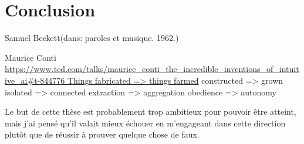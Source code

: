 %
\chapter{Conclusion}
\label{ch:conclusion}

{Samuel Beckett}{(dans: paroles et musique. 1962.)}

Maurice Conti
\url{https://www.ted.com/talks/maurice_conti_the_incredible_inventions_of_intuitive_ai#t-844776
Things fabricated => things farmed}
constructed => grown
isolated => connected
extraction => aggregation
obedience => autonomy


 Le but de cette thèse est probablement trop ambitieux pour pouvoir être atteint, mais j’ai pensé qu’il valait mieux échouer en m’engageant dans cette direction plutôt que de réussir à prouver quelque chose de faux.
